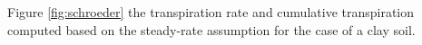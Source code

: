 Figure \ref{fig:schroeder} the transpiration rate and cumulative transpiration computed based on the steady-rate assumption for the case of a clay soil. 







